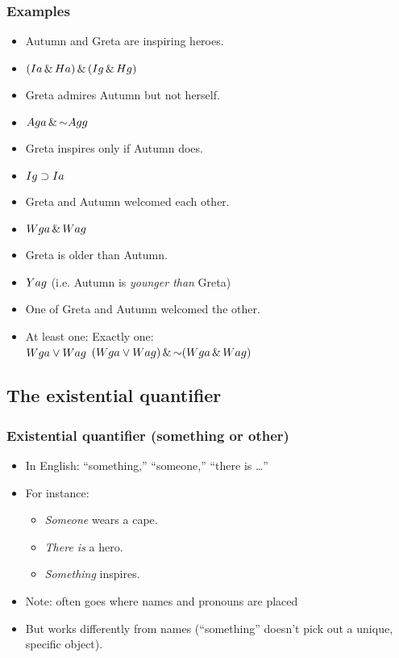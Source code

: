 \begin{frame}
\frametitle{Examples}

\begin{itemize}[<+->]
  \item Autumn and Greta are inspiring heroes.\\
  \item[] \alert{$(Ia \,\&\, Ha) \,\&\, (Ig \,\&\, Hg)$}
  \item Greta admires Autumn but not herself.\\
  \item[] \alert{$A\qr{g}{a} \eand \enot A\qr{g}{g}$}
  \item Greta inspires only if Autumn does.
  \item[] \alert{$Ig \supset Ia$}
  \item Greta and Autumn welcomed each other.
  \item[] \alert{$Wga \,\&\, Wag$} 
  \item Greta is older than Autumn.
  \item[] \alert{$Yag$}  (i.e. Autumn is \textit{younger than} Greta)
  \item One of Greta and Autumn welcomed the other.
  \item[] At least one: \hspace{6em} Exactly one:\\
  \alert{$Wga \vee Wag$} \hspace{6em} \alert{$(W\qr{g}{a} \eor W\qr{a}{g}) \eand \enot(W\qr{g}{a} \eand W\qr{a}{g})$}
\end{itemize}
\end{frame}

\subsection{The existential quantifier}

\begin{frame}
\frametitle{Existential quantifier (something or other)}

\begin{itemize}[<+->]
  \item In English: ``something,'' ``someone,'' ``there is \dots''
  \item For instance:
  \begin{itemize}[<+->]
    \item \emph{Someone} wears a cape.
    \item \emph{There is} a hero.
    \item \emph{Something} inspires.
  \end{itemize}
  
  \bigskip
  
  \item Note: often goes where names and pronouns are placed
  \item But works differently from names (``something'' doesn't pick
  out a unique, specific object).
\end{itemize}
\end{frame}

